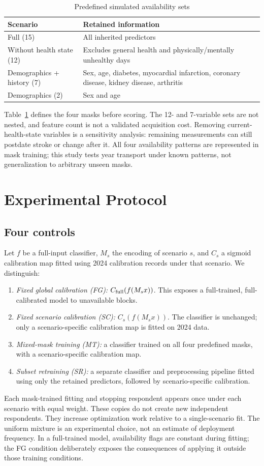 \documentclass[conference,letterpaper]{IEEEtran}
\begin{document}
\begin{table}[t]
\caption{Predefined simulated availability sets}
\label{tab:sets}\centering\small
\begin{tabular}{p{}p{}}\toprule
Scenario & Retained information\\\midrule
Full (15) & All inherited predictors\\
Without health state (12) & Excludes general health and physically/mentally unhealthy days\\
Demographics + history (7) & Sex, age, diabetes, myocardial infarction, coronary disease, kidney disease, arthritis\\
Demographics (2) & Sex and age\\\bottomrule
\end{tabular}
\end{table}

Table~\ref{tab:sets} defines the four masks before scoring. The 12- and 7-variable sets are not nested, and feature count is not a validated acquisition cost. Removing current-health-state variables is a sensitivity analysis: remaining measurements can still postdate stroke or change after it. All four availability patterns are represented in mask training; this study tests year transport under known patterns, not generalization to arbitrary unseen masks.

\section{Experimental Protocol}
\subsection{Four controls}
Let $f$ be a full-input classifier, $M_s$ the encoding of scenario $s$, and $C_s$ a sigmoid calibration map fitted using 2024 calibration records under that scenario. We distinguish:
\begin{enumerate}
\item \emph{Fixed global calibration (FG):} $C_{\rm full}(f(M_s x))$. This exposes a full-trained, full-calibrated model to unavailable blocks.
\item \emph{Fixed scenario calibration (SC):} $C_s(f(M_s x))$. The classifier is unchanged; only a scenario-specific calibration map is fitted on 2024 data.
\item \emph{Mixed-mask training (MT):} a classifier trained on all four predefined masks, with a scenario-specific calibration map.
\item \emph{Subset retraining (SR):} a separate classifier and preprocessing pipeline fitted using only the retained predictors, followed by scenario-specific calibration.
\end{enumerate}
Each mask-trained fitting and stopping respondent appears once under each scenario with equal weight. These copies do not create new independent respondents. They increase optimization work relative to a single-scenario fit. The uniform mixture is an experimental choice, not an estimate of deployment frequency. In a full-trained model, availability flags are constant during fitting; the FG condition deliberately exposes the consequences of applying it outside those training conditions.
\end{document}
